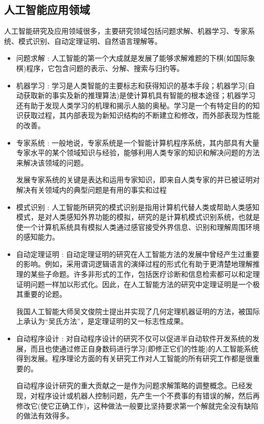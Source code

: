 \documentclass[UTF8,a4paper]{ctexart}
\begin{document}
\subsection{人工智能应用领域}

人工智能研究及应用领域很多，主要研究领域包括问题求解、机器学习、专家系统、模式识别、自动定理证明、自然语言理解等。

\begin{itemize}
	\item 问题求解 : 人工智能的第一个大成就是发展了能够求解难题的下棋(如国际象棋)程序，它包含问题的表示、分解、搜索与归约等。
	\item 机器学习 : 学习是人类智能的主要标志和获得知识的基本手段；机器学习(自动获取新的事实及新的推理算法)是使计算机具有智能的根本途径；机器学习还有助于发现人类学习的机理和揭示人脑的奥秘。学习是一个有特定目的的知识获取过程，其内部表现为新知识结构的不断建立和修改，而外部表现为性能的改善。
	\item 专家系统 : 一般地说，专家系统是一个智能计算机程序系统，其内部具有大量专家水平的某个领域知识与经验，能够利用人类专家的知识和解决问题的方法来解决该领域的问题。

	      发展专家系统的关键是表达和运用专家知识，即来自人类专家的并已被证明对解决有关领域内的典型问题是有用的事实和过程
	\item 模式识别 : 人工智能所研究的模式识别是指用计算机代替人类或帮助人类感知模式，是对人类感知外界功能的模拟，研究的是计算机模式识别系统，也就是使一个计算机系统具有模拟人类通过感官接受外界信息、识别和理解周围环境的感知能力。
	\item 自动定理证明 : 自动定理证明的研究在人工智能方法的发展中曾经产生过重要的影响。例如，采用谓词逻辑语言的演绎过程的形式化有助于更清楚地理解推理的某些子命题。许多非形式的工作，包括医疗诊断和信息检索都可以和定理证明问题一样加以形式化。因此，在人工智能方法的研究中定理证明是一个极其重要的论题。

	      我国人工智能大师吴文俊院士提出并实现了几何定理机器证明的方法，被国际上承认为“吴氏方法”，是定理证明的又一标志性成果。
	\item 自动程序设计 : 对自动程序设计的研究不仅可以促进半自动软件开发系统的发展，而且也使通过修正自身数码进行学习(即修正它们的性能)的人工智能系统得到发展。程序理论方面的有关研究工作对人工智能的所有研究工作都是很重要的。

	      自动程序设计研究的重大贡献之一是作为问题求解策略的调整概念。已经发现，对程序设计或机器人控制问题，先产生一个不费事的有错误的解，然后再修改它(使它正确工作)，这种做法一般要比坚持要求第一个解就完全没有缺陷的做法有效得多。


\end{itemize}
\end{document}
